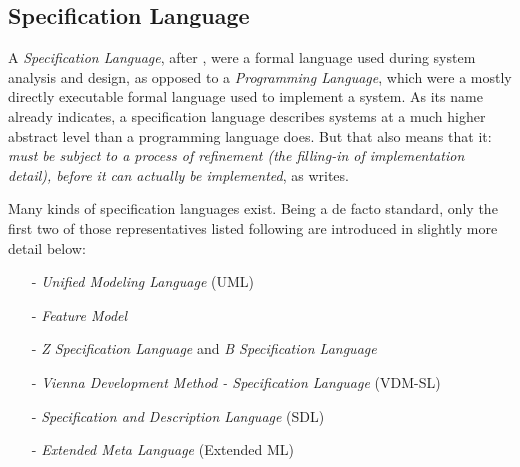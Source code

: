 %
%
%
%
%
%
%

\subsection{Specification Language}
\label{specification_language_heading}

A \emph{Specification Language}, after \cite{wikipedia}, were a formal language
used during system analysis and design, as opposed to a \emph{Programming Language},
which were a mostly directly executable formal language used to implement a system.
As its name already indicates, a specification language describes systems at a much
higher abstract level than a programming language does. But that also means that it:
\textit{must be subject to a process of refinement (the filling-in of implementation
detail), before it can actually be implemented}, as \cite{wikipedia} writes.

Many kinds of specification languages exist. Being a de facto standard, only
the first two of those representatives listed following are introduced in
slightly more detail below:

\begin{itemize}
    \item[-] \emph{Unified Modeling Language} (UML) \cite{uml}
    \item[-] \emph{Feature Model} \cite{foda}
    \item[-] \emph{Z Specification Language} \cite{zspeclang} and
        \emph{B Specification Language} \cite{zb2005}
    \item[-] \emph{Vienna Development Method - Specification Language} (VDM-SL) \cite{vdmsl}
    \item[-] \emph{Specification and Description Language} (SDL) \cite{sdl}
    \item[-] \emph{Extended Meta Language} (Extended ML) \cite{extendedml}
\end{itemize}



